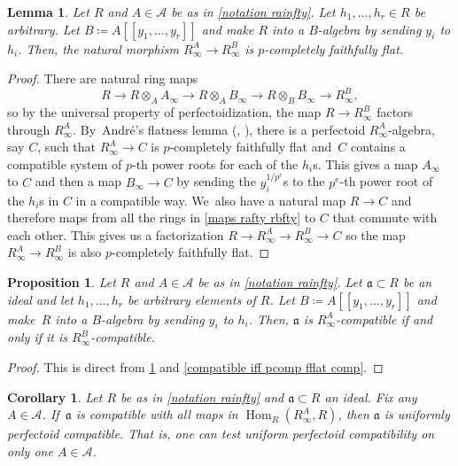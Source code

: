 \documentclass[JEP,XML,SOM,Unicode,published]{cedram}
\let\autoref\cref
\theoremstyle{plain}
\newtheorem{corollary}[theorem]{Corollary}
\newtheorem{proposition}[theorem]{Proposition}
\newtheorem{lemma}[theorem]{Lemma}
\theoremstyle{definition}
\numberwithin{equation}{theorem}
\let\tensor\otimes
\newcommand{\fra}{\mathfrak{a}}
\DeclareMathOperator{\Hom}{Hom}
\newcommand{\llbracket}{[\![}
\newcommand{\rrbracket}{]\!]}
\newcommand{\sA}{\mathcal{A}}
\newcommand{\unpe}{{1/{p^e}}}
\newcommand{\pe}{{p^e}}
\newcommand{\rafty}{R^A_\infty}
\newcommand{\rbfty}{R^B_\infty}
\begin{document}
\begin{lemma}\label{rafty to rbfty is pure when adding roots}
Let $R$ and $A\in \sA$ be as in \autoref{notation rainfty}. Let $h_1,\ldots,h_r\in R$ be arbitrary. Let $B\coloneqq A\llbracket y_1,\ldots,y_r \rrbracket$ and make $R$ into a $B$-algebra by sending $y_i$ to $h_i$. Then, the natural morphism $\rafty\to \rbfty$ is $p$-completely faithfully flat.
\end{lemma}

\begin{proof}
There are natural ring maps
\begin{equation}\label{maps rafty rbfty}
R \to R\tensor_A A_\infty \to R\tensor_A B_\infty \to R\tensor_B B_\infty \to \rbfty,
\end{equation}
so by the universal property of perfectoidization, the map $R\to \rbfty$ factors through $\rafty$. By~André's flatness lemma (\cite[Th.\,2.5.1]{AndreConjectureFacteurDirect}, \cite[Th.\,7.14]{BhattScholzePrisms}), there is a perfectoid $\rafty$-algebra, say $C$, such that $\rafty\to C$ is $p$-completely faithfully flat and~$C$ contains a compatible system of $p$-th power roots for each of the $h_i$s. This gives a map $A_\infty$ to $C$ and then a map $B_\infty \to C$ by sending the $y_i^{\unpe}$s to the $\pe$-th power root of the $h_i$s in $C$ in a compatible way. We~also have a natural map $R\to C$ and therefore maps from all the rings in \autoref{maps rafty rbfty} to $C$ that commute with each other. This gives us a factorization $R\to \rafty \to \rbfty \to C$ so the map $\rafty \to \rbfty$ is also $p$-completely faithfully flat.
\end{proof}

\begin{proposition}\label{compatible with rafty iff compatible with rbfty}
Let $R$ and $A\in \sA$ be as in \autoref{notation rainfty}. Let $\fra\subset R$ be an ideal and let $h_1,\ldots,h_r$ be arbitrary elements of $R$. Let $B\coloneqq A\llbracket y_1,\ldots,y_r \rrbracket$ and make~$R$ into a $B$-algebra by sending $y_i$ to $h_i$. Then, $\fra$ is $\rafty$-compatible if and only if it is $\rbfty$-compatible.
\end{proposition}

\begin{proof}
This is direct from \autoref{rafty to rbfty is pure when adding roots} and \autoref{compatible iff pcomp fflat comp}.
\end{proof}

\begin{corollary}\label{uniformly compatible doesn't depend on the choice of A}
Let $R$ be as in \autoref{notation rainfty} and $\fra\subset R$ an ideal. Fix any $A\in \sA$. If~$\fra$ is compatible with all maps in $\Hom_R(\rafty,R)$, then $\fra$ is uniformly perfectoid compatible. That is, one can test uniform perfectoid compatibility on only one $A\in \sA$.
\end{corollary}
\end{document}
